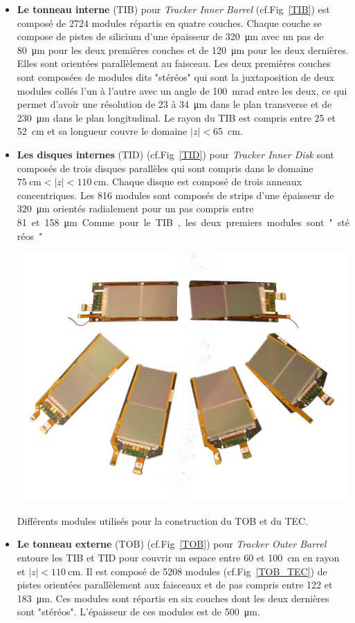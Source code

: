 \begin{itemize}[label=$\bullet$]
\item \textbf{Le tonneau interne} (TIB) pour  \textit{Tracker Inner Barrel} (cf.Fig~\ref{TIB}) est composé de \num{2724} modules répartis en quatre couches. Chaque couche se compose de pistes de silicium d'une épaisseur de \SI{320}{\micro\meter} avec un pas de \SI{80}{\micro\meter} pour les deux premières couches et de \SI{120}{\micro\meter} pour les deux dernières. Elles sont orientées parallèlement au faisceau. Les deux premières couches sont composées de modules dits "stéréos" qui sont la juxtaposition de deux modules collés l'un à l'autre avec un angle de \SI{100}{\milli\radian} entre les deux, ce qui permet d'avoir une résolution de \num{23} à \SI{34}{\micro\m} dans le plan transverse et de \SI{230}{\micro\meter} dans le plan longitudinal. Le rayon du TIB est compris entre \num{25} et \SI{52}{\centi\meter} et sa longueur couvre le domaine $|z|<$\SI{65}{\centi\meter}.

\item \textbf{Les disques internes} (TID) (cf.Fig~\ref{TID}) pour \textit{Tracker Inner Disk} sont composés de trois disques parallèles qui sont compris dans le domaine $\SI{75}{\centi\meter}<|z|<\SI{110}{\centi\meter}$. Chaque disque est composé de trois anneaux concentriques. Les \num{816} modules sont composés de strips d'une épaisseur de \SI{320}{\micro\meter} orientés radialement pour un pas compris entre \SI{81} et \SI{158}{\micro\meter}. Comme pour le TIB, les deux premiers modules sont "stéréos".
\marginpar
{
	\centering
	\includegraphics[width=\marginparwidth]{CMS/TOB_TEC.png}
	\captionsetup{type=figure}\caption{Différents modules utilisés pour la construction du TOB et du TEC.}
	\label{TOB_TEC}
}
\item \textbf{Le tonneau externe } (TOB) (cf.Fig~\ref{TOB}) pour \textit{Tracker Outer Barrel} entoure les TIB et TID pour couvrir un espace entre \num{60} et \SI{100}{\centi\meter} en rayon et $|z|<\SI{110}{\centi\meter}$. Il est composé de \num{5208} modules (cf.Fig~\ref{TOB_TEC}) de pistes orientées parallèlement aux faisceaux et de pas compris entre \num{122} et \SI{183}{\micro\meter}. Ces modules sont répartis en six couches dont les deux dernières sont "stéréos". L'épaisseur de ces modules est de \SI{500}{\micro\meter}.   


\end{itemize}
